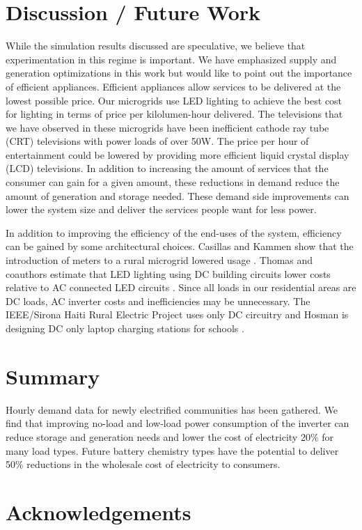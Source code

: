 \documentclass[conference]{IEEEtran}
\begin{document}
\section{Discussion / Future Work}
While the simulation results discussed are speculative,
we believe that experimentation in this regime is important.
We have emphasized supply and generation optimizations in
this work but would like to point out the importance of
efficient appliances.
Efficient appliances allow services to be delivered at the
lowest possible price.
Our microgrids use LED lighting to achieve the best cost for
lighting in terms of price per kilolumen-hour delivered.
The televisions that we have observed in these microgrids
have been inefficient cathode ray tube (CRT) televisions
with power loads of over 50W.
The price per hour of entertainment could be lowered by providing
more efficient liquid crystal display (LCD) televisions.
In addition to increasing the amount of services that the consumer
can gain for a given amount, these reductions in demand
reduce the amount of generation and storage needed.
These demand side improvements can lower the system size and
deliver the services people want for less power.

In addition to improving the efficiency of the end-uses of
the system, efficiency can be gained by some architectural
choices.
Casillas and Kammen show that the introduction of meters
to a rural microgrid lowered usage \cite{Casillas-2010}.
Thomas and coauthors estimate that LED lighting using DC
building circuits lower costs relative to AC connected
LED circuits \cite{EdisonRevisited}.
Since all loads in our residential areas are DC loads,
AC inverter costs and inefficiencies may be unnecessary.
The IEEE/Sirona Haiti Rural Electric Project \cite{Sirona}
uses only
DC circuitry and Hosman is designing DC only laptop charging stations
for schools \cite{Hosman}.



\section{Summary}
Hourly demand data for newly electrified communities has been gathered.
We find that improving no-load and low-load power consumption of the
inverter can reduce storage and generation needs and lower the cost
of electricity 20\% for many load types.
Future battery chemistry types have the potential to deliver 50\%
reductions in the wholesale cost of electricity to consumers.


\section{Acknowledgements}
\end{document}
